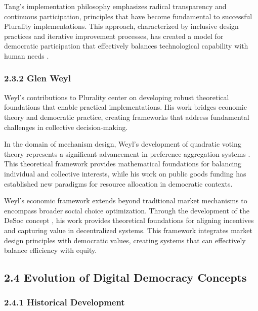 Tang's implementation philosophy emphasizes radical transparency and continuous participation, principles that have become fundamental to successful Plurality implementations. This approach, characterized by inclusive design practices and iterative improvement processes, has created a model for democratic participation that effectively balances technological capability with human needs \citep{pdis2024}.

\hypertarget{glen-weyl}{%
\subsubsection{2.3.2 Glen Weyl}\label{glen-weyl}}

Weyl's contributions to Plurality center on developing robust theoretical foundations that enable practical implementations. His work bridges economic theory and democratic practice, creating frameworks that address fundamental challenges in collective decision-making.

In the domain of mechanism design, Weyl's development of quadratic voting theory represents a significant advancement in preference aggregation systems \citep{buterin2019flexible}. This theoretical framework provides mathematical foundations for balancing individual and collective interests, while his work on public goods funding has established new paradigms for resource allocation in democratic contexts.

Weyl's economic framework extends beyond traditional market mechanisms to encompass broader social choice optimization. Through the development of the DeSoc concept \citep{weyl2022decentralized}, his work provides theoretical foundations for aligning incentives and capturing value in decentralized systems. This framework integrates market design principles with democratic values, creating systems that can effectively balance efficiency with equity.

\hypertarget{evolution-of-digital-democracy-concepts}{%
\subsection{2.4 Evolution of Digital Democracy Concepts}\label{evolution-of-digital-democracy-concepts}}

\hypertarget{historical-development}{%
\subsubsection{2.4.1 Historical Development}\label{historical-development}}

